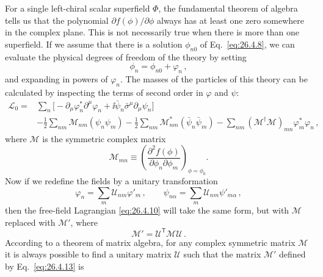 For a single left-chiral scalar superfield \(\Phi\), the fundamental theorem
of algebra tells us that the polynomial \(\partial f(\phi)/\partial\phi\)
always has at least one zero somewhere in the complex plane. This is not
necessarily true when there is more than one superfield. If we assume that
there is a solution \(\phi_{n0}\) of Eq.~\eqref{eq:26.4.8}, we can evaluate the
physical degrees of freedom of the theory by setting
\begin{equation}
  \phi_n=\phi_{n0}+\varphi_n\,,
  \tag{26.4.9}\label{eq:26.4.9}
\end{equation}
and expanding in powers of \(\varphi_n\). The masses of the particles of this
theory can be calculated by inspecting the terms of second order in
\(\varphi\) and \(\psi\):
\begin{equation}
  \begin{aligned}
  \mathcal{L}_0={}&
  \sum_n\biggl[
    -\partial_\mu\varphi_n^*\partial^\mu\varphi_n
    +\ii\bar\psi_n\bar\sigma^\mu\partial_\mu\psi_n
  \biggr]
  \\
  &-\frac12\sum_{nm}\mathcal{M}_{nm}(\psi_n\psi_m)
  -\frac12\sum_{nm}\mathcal{M}_{nm}^*
    (\bar\psi_n\bar\psi_m)
  -\sum_{nm}(\mathcal{M}^\dagger\mathcal{M})_{mn}
    \varphi_m^*\varphi_n\,,
  \end{aligned}
  \tag{26.4.10}\label{eq:26.4.10}
\end{equation}
where \(\mathcal{M}\) is the symmetric complex matrix
\begin{equation}
  \mathcal{M}_{mn}\equiv
  \left(
    \frac{\partial^2f(\phi)}{\partial\phi_n\partial\phi_m}
  \right)_{\phi=\phi_0}.
  \tag{26.4.11}\label{eq:26.4.11}
\end{equation}
Now if we redefine the fields by a unitary transformation
\begin{equation}
  \varphi_n=\sum_m\mathcal{U}_{nm}\varphi'_m\,,
  \qquad
  \psi_{n\alpha}=\sum_m\mathcal{U}_{nm}\psi'_{m\alpha}\,,
  \tag{26.4.12}\label{eq:26.4.12}
\end{equation}
then the free-field Lagrangian \eqref{eq:26.4.10} will take the same form, but
with \(\mathcal{M}\) replaced with \(\mathcal{M}'\), where
\begin{equation}
  \mathcal{M}'=\mathcal{U}^{\mathsf T}\mathcal{M}\mathcal{U}\,.
  \tag{26.4.13}\label{eq:26.4.13}
\end{equation}
According to a theorem of matrix algebra, for any complex symmetric matrix
\(\mathcal{M}\) it is always possible to find a unitary matrix \(\mathcal{U}\)
such that the matrix \(\mathcal{M}'\) defined by Eq.~\eqref{eq:26.4.13} is
